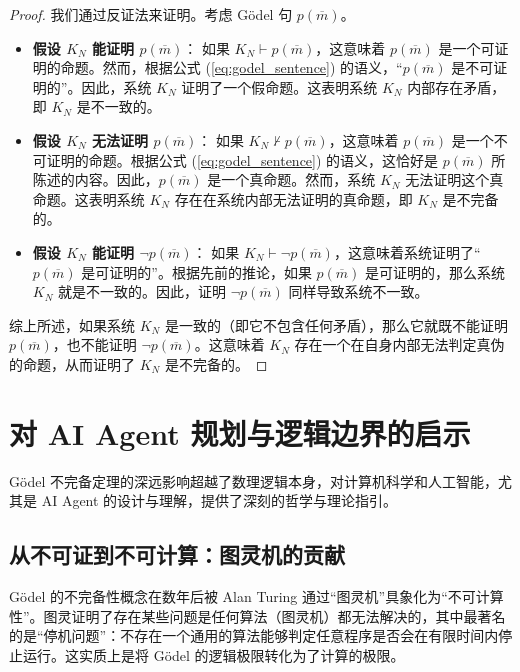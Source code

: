\documentclass[a4paper,12pt]{ctexart}
\begin{document}
\begin{proof}
    我们通过反证法来证明。考虑 Gödel 句 $p(\overline{m})$。
    \begin{itemize}[leftmargin=*,noitemsep,topsep=0pt]
        \item \textbf{假设 $K_N$ 能证明 $p(\overline{m})$}：
        如果 $K_N \vdash p(\overline{m})$，这意味着 $p(\overline{m})$ 是一个可证明的命题。然而，根据公式 (\ref{eq:godel_sentence}) 的语义，“$p(\overline{m})$ 是不可证明的”。因此，系统 $K_N$ 证明了一个假命题。这表明系统 $K_N$ 内部存在矛盾，即 $K_N$ 是不一致的。
        \item \textbf{假设 $K_N$ 无法证明 $p(\overline{m})$}：
        如果 $K_N \nvdash p(\overline{m})$，这意味着 $p(\overline{m})$ 是一个不可证明的命题。根据公式 (\ref{eq:godel_sentence}) 的语义，这恰好是 $p(\overline{m})$ 所陈述的内容。因此，$p(\overline{m})$ 是一个真命题。然而，系统 $K_N$ 无法证明这个真命题。这表明系统 $K_N$ 存在在系统内部无法证明的真命题，即 $K_N$ 是不完备的。
        \item \textbf{假设 $K_N$ 能证明 $\neg p(\overline{m})$}：
        如果 $K_N \vdash \neg p(\overline{m})$，这意味着系统证明了“$p(\overline{m})$ 是可证明的”。根据先前的推论，如果 $p(\overline{m})$ 是可证明的，那么系统 $K_N$ 就是不一致的。因此，证明 $\neg p(\overline{m})$ 同样导致系统不一致。
    \end{itemize}
    综上所述，如果系统 $K_N$ 是一致的（即它不包含任何矛盾），那么它就既不能证明 $p(\overline{m})$，也不能证明 $\neg p(\overline{m})$。这意味着 $K_N$ 存在一个在自身内部无法判定真伪的命题，从而证明了 $K_N$ 是不完备的。
\end{proof}

\section{对 AI Agent 规划与逻辑边界的启示}
Gödel 不完备定理的深远影响超越了数理逻辑本身，对计算机科学和人工智能，尤其是 AI Agent 的设计与理解，提供了深刻的哲学与理论指引。

\subsection{从不可证到不可计算：图灵机的贡献}
Gödel 的不完备性概念在数年后被 Alan Turing 通过“图灵机”具象化为“不可计算性”。图灵证明了存在某些问题是任何算法（图灵机）都无法解决的，其中最著名的是“停机问题”：不存在一个通用的算法能够判定任意程序是否会在有限时间内停止运行。这实质上是将 Gödel 的逻辑极限转化为了计算的极限。
\end{document}
